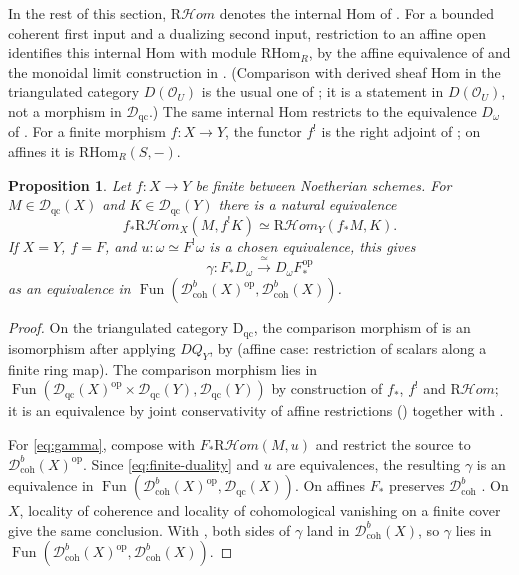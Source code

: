 \documentclass[11pt]{amsart}
\newcommand{\cO}{\mathcal{O}}
\newcommand{\op}{{\operatorname{op}}}
\DeclareMathOperator{\Fun}{\mathrm{Fun}}
\newcommand{\RHom}{\mathrm R\mathcal Hom}
\newcommand{\Dqc}{\mathcal D_{\mathrm{qc}}}
\newcommand{\Dbc}{\mathcal D^b_{\mathrm{coh}}}
\theoremstyle{plain}
\newtheorem{proposition}[proposition]{Proposition}
\theoremstyle{definition}
\numberwithin{equation}{section}
\begin{document}
In the rest of this section, $\RHom$ denotes the internal Hom of .
For a bounded coherent first input and a dualizing second input, restriction to an affine open identifies this internal Hom with module $\mathrm{RHom}_R$, by the affine equivalence of  and the monoidal limit construction in .
(Comparison with derived sheaf Hom in the triangulated category $D(\cO_U)$ is the usual one of \cite[\href{https://stacks.math.columbia.edu/tag/0A88}{Tag 0A88}]{SP}; it is a statement in $D(\cO_U)$, not a morphism in $\Dqc$.)
The same internal Hom restricts to the equivalence $D_\omega$ of .
For a finite morphism $f:X\to Y$, the functor $f^!$ is the right adjoint of ; on affines it is $\mathrm{RHom}_R(S,-)$.

\begin{proposition}\label{prop:finite-duality}
Let $f:X\to Y$ be finite between Noetherian schemes.
For $M\in\Dqc(X)$ and $K\in\Dqc(Y)$ there is a natural equivalence
\begin{equation}\label{eq:finite-duality}
 f_*\RHom_X(M,f^!K)\simeq\RHom_Y(f_*M,K).
\end{equation}
If $X=Y$, $f=F$, and $u:\omega\simeq F^!\omega$ is a chosen equivalence, this gives
\begin{equation}\label{eq:gamma}
 \gamma:F_*D_\omega\xrightarrow{\ \simeq\ }D_\omega F_*^{\op}
\end{equation}
as an equivalence in $\Fun(\Dbc(X)^{\op},\Dbc(X))$.
\end{proposition}
\begin{proof}
On the triangulated category $\mathrm D_{\mathrm{qc}}$, the comparison morphism of \cite[\href{https://stacks.math.columbia.edu/tag/0B6H}{Tag 0B6H}]{SP} is an isomorphism after applying $DQ_Y$, by \cite[\href{https://stacks.math.columbia.edu/tag/0A9Q}{Tag 0A9Q}]{SP} (affine case: restriction of scalars along a finite ring map).
The comparison morphism lies in $\Fun(\Dqc(X)^{\op}\times\Dqc(Y),\Dqc(Y))$ by construction of $f_*$, $f^!$ and $\RHom$; it is an equivalence by joint conservativity of affine restrictions () together with .

For \eqref{eq:gamma}, compose with $F_*\RHom(M,u)$ and restrict the source to $\Dbc(X)^{\op}$.
Since \eqref{eq:finite-duality} and $u$ are equivalences, the resulting $\gamma$ is an equivalence in $\Fun(\Dbc(X)^{\op},\Dqc(X))$.
On affines $F_*$ preserves $\Dbc$ \cite[\href{https://stacks.math.columbia.edu/tag/00GJ}{Tag 00GJ}]{SP}.
On $X$, locality of coherence \cite[\href{https://stacks.math.columbia.edu/tag/01XZ}{Tag 01XZ}]{SP} and locality of cohomological vanishing on a finite cover give the same conclusion.
With , both sides of $\gamma$ land in $\Dbc(X)$, so $\gamma$ lies in $\Fun(\Dbc(X)^{\op},\Dbc(X))$.
\end{proof}
\end{document}
